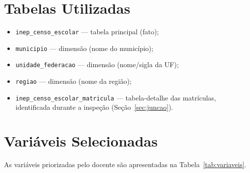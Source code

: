 \documentclass[
    12pt,
    oneside,
    a4paper,
    chapter=TITLE,
    section=TITLE
]{abntex2}
\begin{document}
\section{Tabelas Utilizadas}
\begin{itemize}[itemsep=1pt]
  \item \texttt{inep\_censo\_escolar} --- tabela principal (fato);
  \item \texttt{municipio} --- dimensão (nome do município);
  \item \texttt{unidade\_federacao} --- dimensão (nome/sigla da UF);
  \item \texttt{regiao} --- dimensão (nome da região);
  \item \texttt{inep\_censo\_escolar\_matricula} --- tabela-detalhe das matrículas,
        identificada durante a inspeção (Seção~\ref{sec:juncao}).
\end{itemize}

\section{Variáveis Selecionadas}
\label{sec:variaveis}
As variáveis priorizadas pelo docente são apresentadas na Tabela~\ref{tab:variaveis}.
\end{document}

